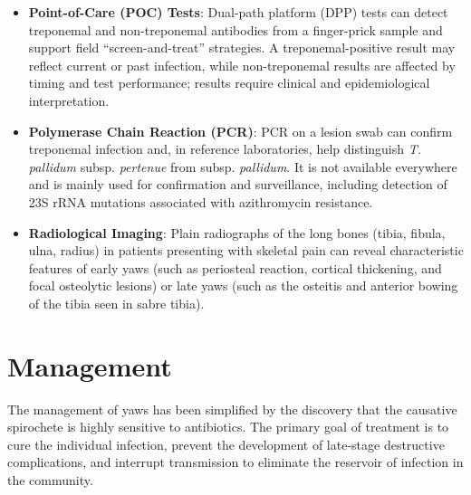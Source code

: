 \begin{itemize}
\begin{itemize}
    \end{itemize}
    \item \textbf{Point-of-Care (POC) Tests}: Dual-path platform (DPP) tests can detect treponemal and non-treponemal antibodies from a finger-prick sample and support field ``screen-and-treat'' strategies. A treponemal-positive result may reflect current or past infection, while non-treponemal results are affected by timing and test performance; results require clinical and epidemiological interpretation.
    \item \textbf{Polymerase Chain Reaction (PCR)}: PCR on a lesion swab can confirm treponemal infection and, in reference laboratories, help distinguish \textit{T. pallidum} subsp. \textit{pertenue} from subsp. \textit{pallidum}. It is not available everywhere and is mainly used for confirmation and surveillance, including detection of 23S rRNA mutations associated with azithromycin resistance.
    \item \textbf{Radiological Imaging}: Plain radiographs of the long bones (tibia, fibula, ulna, radius) in patients presenting with skeletal pain can reveal characteristic features of early yaws (such as periosteal reaction, cortical thickening, and focal osteolytic lesions) or late yaws (such as the osteitis and anterior bowing of the tibia seen in sabre tibia).
\end{itemize}

\section*{Management}
The management of yaws has been simplified by the discovery that the causative spirochete is highly sensitive to antibiotics. The primary goal of treatment is to cure the individual infection, prevent the development of late-stage destructive complications, and interrupt transmission to eliminate the reservoir of infection in the community.

